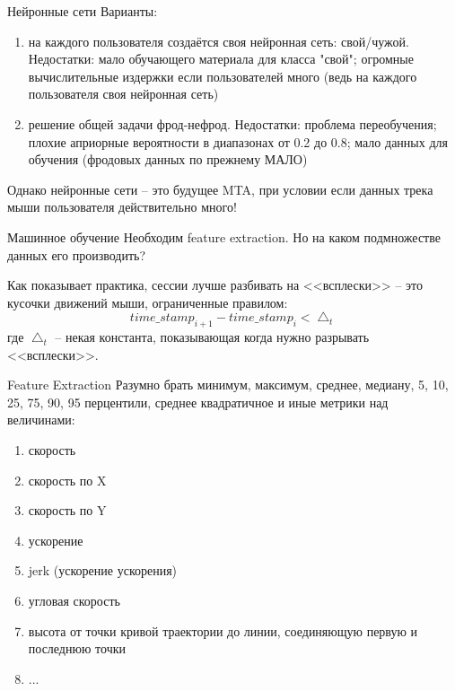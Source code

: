 \begin{frame}{Нейронные сети}
	Варианты:
	\begin{enumerate}
		\item на каждого пользователя создаётся своя нейронная сеть: свой/чужой.
		Недостатки: мало обучающего материала для класса "свой";
		огромные вычислительные издержки если пользователей много 
		(ведь на каждого пользователя своя нейронная сеть)
		\item решение общей задачи фрод-нефрод.
		Недостатки: проблема переобучения; плохие априорные вероятности в 
		диапазонах от 0.2 до 0.8;
		мало данных для обучения (фродовых данных по прежнему МАЛО)
	\end{enumerate}

	Однако нейронные сети -- это будущее MTA, при условии если данных 
	трека мыши пользователя действительно много!
\end{frame}

\begin{frame}{Машинное обучение}
	Необходим feature extraction. Но на каком подмножестве данных его производить?
	
	Как показывает практика, сессии лучше разбивать на <<всплески>> -- 
	это кусочки движений мыши, ограниченные правилом:
	\begin{equation}
	time\_stamp_{i+1} - time\_stamp_{i} < \bigtriangleup_{t}
	\end{equation}
	где $ \bigtriangleup_{t}$ -- некая константа, показывающая 
	когда нужно разрывать <<всплески>>.
	
\end{frame}

\begin{frame}{Feature Extraction}
	Разумно брать минимум, максимум, среднее, медиану, 5, 10, 25, 75, 90, 95 перцентили,
	среднее квадратичное и иные метрики над величинами:
	
	\begin{enumerate}
		\item скорость
		\item скорость по X
		\item скорость по Y
		\item ускорение
		\item jerk (ускорение ускорения)
		\item угловая скорость
		\item высота от точки кривой траектории до линии, соединяющую первую и последнюю точки
		\item ...
	\end{enumerate}
\end{frame}

